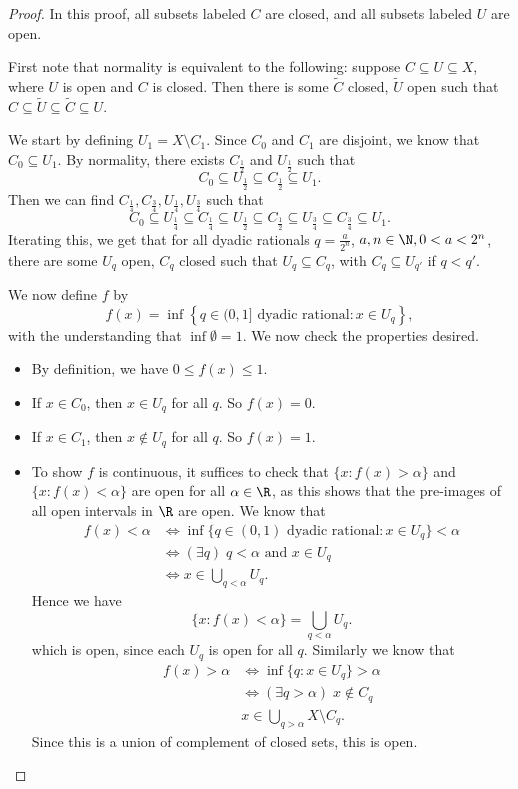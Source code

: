 \documentclass[a4paper]{article}
\begin{document}
\begin{proof}
  In this proof, all subsets labeled $C$ are closed, and all subsets labeled $U$ are open.

  First note that normality is equivalent to the following: suppose $C \subseteq U \subseteq X$, where $U$ is open and $C$ is closed. Then there is some $\tilde{C}$ closed, $\tilde{U}$ open such that $C\subseteq \tilde{U} \subseteq \tilde{C} \subseteq U$.

  We start by defining $U_1 = X \setminus C_1$. Since $C_0$ and $C_1$ are disjoint, we know that $C_0 \subseteq U_1$. By normality, there exists $C_{\frac{1}{2}}$ and $U_{\frac{1}{2}}$ such that
  \[
    C_0 \subseteq U_{\frac{1}{2}} \subseteq C_{\frac{1}{2}} \subseteq U_1.
  \]
  Then we can find $C_{\frac{1}{4}}, C_{\frac{3}{4}}, U_{\frac{1}{4}}, U_{\frac{3}{4}}$ such that
  \[
    C_0 \subseteq U_{\frac{1}{4}}\subseteq C_{\frac{1}{4}} \subseteq U_{\frac{1}{2}} \subseteq C_{\frac{1}{2}} \subseteq U_{\frac{3}{4}} \subseteq C_{\frac{3}{4}} \subseteq U_1.
  \]
  Iterating this, we get that for all dyadic rationals $q = \frac{a}{2^n}$, $a, n\in \N, 0 < a < 2^n$, there are some $U_q$ open, $C_q$ closed such that $U_q \subseteq C_q$, with $C_q \subseteq U_{q'}$ if $q < q'$.

  We now define $f$ by
  \[
  f(x) = \inf\left\{q \in (0, 1] \text{ dyadic rational}: x \in U_q\right\},
\]
with the understanding that $\inf \emptyset = 1$. We now check the properties desired.
\begin{itemize}
  \item By definition, we have $0 \leq f(x) \leq 1$.
  \item If $x \in C_0$, then $x \in U_q$ for all $q$. So $f(x) = 0$.
  \item If $x \in C_1$, then $x \not\in U_q$ for all $q$. So $f(x) = 1$.
  \item To show $f$ is continuous, it suffices to check that $\{x: f(x) > \alpha\}$ and $\{x: f(x) < \alpha\}$ are open for all $\alpha \in \R$, as this shows that the pre-images of all open intervals in $\R$ are open. We know that
    \begin{align*}
      f(x) < \alpha &\Leftrightarrow \inf\{q \in (0, 1)\text{ dyadic rational}: x \in U_q\} < \alpha \\
      &\Leftrightarrow (\exists q)\; q < \alpha \text{ and }x \in U_q\\
      &\Leftrightarrow x \in \bigcup_{q < \alpha} U_q.
    \end{align*}
    Hence we have
    \[
      \{x: f(x) < \alpha\} = \bigcup_{q < \alpha} U_q.
    \]
    which is open, since each $U_q$ is open for all $q$. Similarly we know that
    \begin{align*}
      f(x) > \alpha &\Leftrightarrow \inf\{q: x \in U_q\} > \alpha\\
      &\Leftrightarrow (\exists q > \alpha)\; x \not\in C_q\\
      & x \in \bigcup_{q > \alpha} X \setminus C_q.
    \end{align*}
    Since this is a union of complement of closed sets, this is open.
\end{itemize}
\end{proof}
\end{document}
